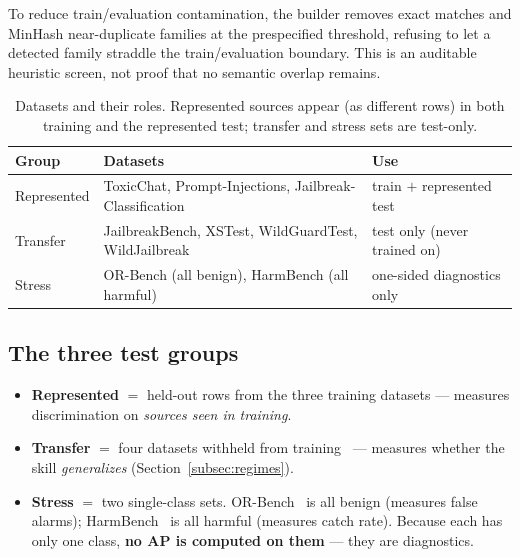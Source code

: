 \documentclass[11pt]{article}
\begin{document}
To reduce train/evaluation contamination, the builder removes exact matches and MinHash
near-duplicate families at the prespecified threshold, refusing to let a detected family
straddle the train/evaluation boundary. This is an auditable heuristic screen, not proof that
no semantic overlap remains.

\begin{table}[t]
\centering\small
\caption{Datasets and their roles. Represented sources appear (as different rows) in both
training and the represented test; transfer and stress sets are test-only.}
\label{tab:data}
\begin{tabular}{lll}
\toprule
Group & Datasets & Use \\
\midrule
Represented & ToxicChat, Prompt-Injections, Jailbreak-Classification & train $+$ represented test \\
Transfer & JailbreakBench, XSTest, WildGuardTest, WildJailbreak & test only (never trained on) \\
Stress & OR-Bench (all benign), HarmBench (all harmful) & one-sided diagnostics only \\
\bottomrule
\end{tabular}
\end{table}

\subsection{The three test groups}
\begin{itemize}
\item \textbf{Represented} $=$ held-out rows from the three training datasets --- measures
discrimination on \emph{sources seen in training}.
\item \textbf{Transfer} $=$ four datasets withheld from training~\cite{chao2024jailbreakbench,rottger2024xstest,han2024wildguard,jiang2024wildteaming}
--- measures whether the skill \emph{generalizes} (Section~\ref{subsec:regimes}).
\item \textbf{Stress} $=$ two single-class sets. OR-Bench~\cite{cui2024orbench} is all benign (measures false
alarms); HarmBench~\cite{mazeika2024harmbench} is all harmful (measures catch rate). Because each has only one class,
\textbf{no AP is computed on them} --- they are diagnostics.
\end{itemize}
\end{document}
